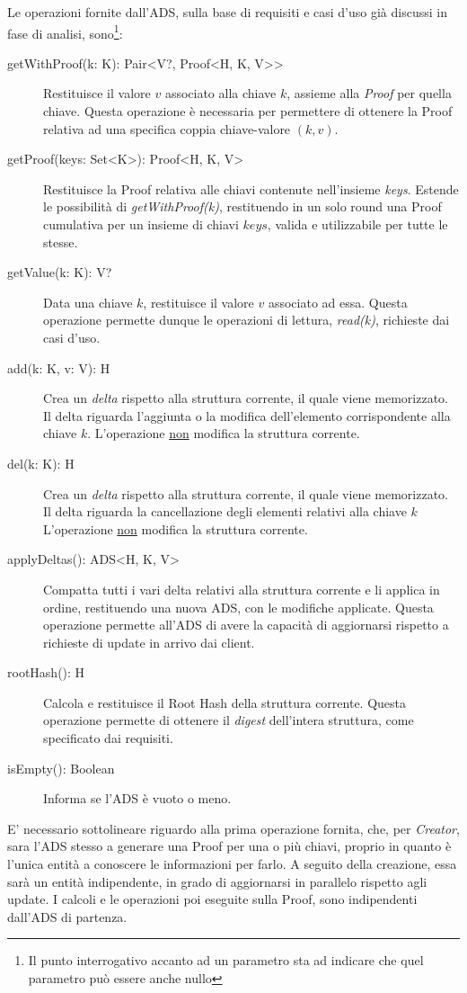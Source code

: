 		Le operazioni fornite dall'ADS, sulla base di requisiti e casi d'uso già discussi in fase di analisi, sono\footnote{Il punto interrogativo accanto ad un parametro sta ad indicare che quel parametro può essere anche nullo}:
		\begin{description}
			\item[getWithProof(k: K): Pair<V?, Proof<H, K, V>{}>] Restituisce il valore $ v $ associato alla chiave $ k $, assieme alla \textit{Proof} per quella chiave. Questa operazione è necessaria per permettere di ottenere la Proof relativa ad una specifica coppia chiave-valore $ (k,v) $.
			\item[getProof(keys: Set<K>): Proof<H, K, V>] Restituisce la Proof relativa alle chiavi contenute nell'insieme \textit{keys}. Estende le possibilità di \textit{getWithProof(k)}, restituendo in un solo round una Proof cumulativa per un insieme di chiavi $ keys $, valida e utilizzabile per tutte le stesse. 
			\item[getValue(k: K): V?] Data una chiave $ k $, restituisce il valore $ v $ associato ad essa. Questa operazione permette dunque le operazioni di lettura, \textit{read(k)}, richieste dai casi d'uso.
			\item[add(k: K, v: V): H] Crea un \textit{delta} rispetto alla struttura corrente, il quale viene memorizzato. Il delta riguarda l'aggiunta o la modifica dell'elemento corrispondente alla chiave $ k $. L'operazione \underline{non} modifica la struttura corrente.
			\item[del(k: K): H] Crea un \textit{delta} rispetto alla struttura corrente, il quale viene memorizzato. Il delta riguarda la cancellazione degli elementi relativi alla chiave $ k $ L'operazione \underline{non} modifica la struttura corrente.
			\item[applyDeltas(): ADS<H, K, V>] Compatta tutti i vari delta relativi alla struttura corrente e li applica in ordine, restituendo una nuova ADS, con le modifiche applicate. Questa operazione permette all'ADS di avere la capacità di aggiornarsi rispetto a richieste di update in arrivo dai client.
			\item[rootHash(): H] Calcola e restituisce il Root Hash della struttura corrente. Questa operazione permette di ottenere il \textit{digest} dell'intera struttura, come specificato dai requisiti.
			\item[isEmpty(): Boolean] Informa se l'ADS è vuoto o meno.
		\end{description}
	
		E' necessario sottolineare riguardo alla prima operazione fornita, che, per \textit{Creator}, sara l'ADS stesso a generare una Proof per una o più chiavi, proprio in quanto è l'unica entità a conoscere le informazioni per farlo. A seguito della creazione, essa sarà un entità indipendente, in grado di aggiornarsi in parallelo rispetto agli update. I calcoli e le operazioni poi eseguite sulla Proof, sono indipendenti dall'ADS di partenza.
		
